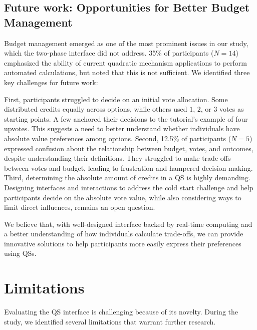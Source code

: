 {\subsection{Future work: Opportunities for Better Budget Management}
Budget management emerged as one of the most prominent issues in our study, which the two-phase interface did not address. 35\% of participants ($N=14$) emphasized the ability of current quadratic mechanism applications to perform automated calculations, but noted that this is not sufficient.  We identified three key challenges for future work:

First, participants struggled to decide on an initial vote allocation. Some distributed credits equally across options, while others used $1$, $2$, or $3$ votes as starting points. A few anchored their decisions to the tutorial's example of four upvotes. This suggests a need to better understand whether individuals have absolute value preferences among options. Second, 12.5\% of participants ($N=5$) expressed confusion about the relationship between budget, votes, and outcomes, despite understanding their definitions. They struggled to make trade-offs between votes and budget, leading to frustration and hampered decision-making. Third, determining the absolute amount of credits in a QS is highly demanding. Designing interfaces and interactions to address the cold start challenge and help participants decide on the absolute vote value, while also considering ways to limit direct influences, remains an open question.

We believe that, with well-designed interface backed by real-time computing and a better understanding of how individuals calculate trade-offs, we can provide innovative solutions to help participants more easily express their preferences using QSs.
}

\section{Limitations}
\label{sec:limitations}
Evaluating the QS interface is challenging because of its novelty. During the study, we identified several limitations that warrant further research.


